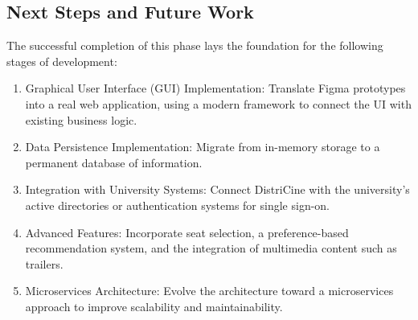 \documentclass[12pt]{article}
\begin{document}
\subsection{Next Steps and Future Work}
The successful completion of this phase lays the foundation for the following stages of development:
\begin{enumerate}
    \item Graphical User Interface (GUI) Implementation: Translate Figma prototypes into a real web application, using a modern framework to connect the UI with existing business logic.
    \item Data Persistence Implementation: Migrate from in-memory storage to a permanent database of information.
    \item Integration with University Systems: Connect DistriCine with the university's active directories or authentication systems for single sign-on.
    \item Advanced Features: Incorporate seat selection, a preference-based recommendation system, and the integration of multimedia content such as trailers.
    \item Microservices Architecture: Evolve the architecture toward a microservices approach to improve scalability and maintainability.
\end{enumerate}
\end{document}
